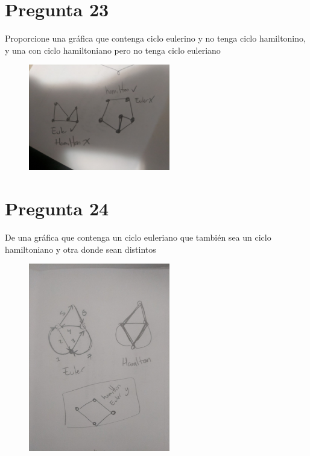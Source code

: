 \documentclass[12pt, fleqn]{article}                            %
\theoremstyle{break}                                            %
\begin{document}
    \clearpage
    \section{Pregunta 23}

   
        Proporcione una gráfica que contenga ciclo eulerino y no tenga ciclo hamiltonino, y una con ciclo hamiltoniano pero no tenga ciclo euleriano
                
        \begin{figure}[h]
            \centering
            \includegraphics[width=0.55\textwidth]{Question23}
        \end{figure}


    \clearpage
    \section{Pregunta 24}

   
        De una gráfica que contenga un ciclo euleriano que también sea un ciclo
        hamiltoniano y otra donde sean distintos

        \begin{figure}[h]
            \centering
            \includegraphics[width=0.55\textwidth]{Question24}
        \end{figure}
\end{document}
